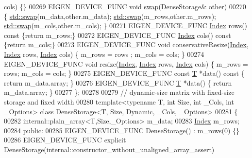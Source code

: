 \begin{DoxyCode}
      cols) \{\}
00269     EIGEN\_DEVICE\_FUNC \textcolor{keywordtype}{void} \hyperlink{endian_8c_a3ca5ecd34b04d6a243c054ac3a57f68d}{swap}(DenseStorage& other)
00270     \{ \hyperlink{endian_8c_a3ca5ecd34b04d6a243c054ac3a57f68d}{std::swap}(m\_data,other.m\_data); \hyperlink{endian_8c_a3ca5ecd34b04d6a243c054ac3a57f68d}{std::swap}(m\_rows,other.m\_rows); 
      \hyperlink{endian_8c_a3ca5ecd34b04d6a243c054ac3a57f68d}{std::swap}(m\_cols,other.m\_cols); \}
00271     EIGEN\_DEVICE\_FUNC \hyperlink{namespace_eigen_a62e77e0933482dafde8fe197d9a2cfde}{Index} rows()\textcolor{keyword}{ const }\{\textcolor{keywordflow}{return} m\_rows;\}
00272     EIGEN\_DEVICE\_FUNC \hyperlink{namespace_eigen_a62e77e0933482dafde8fe197d9a2cfde}{Index} cols()\textcolor{keyword}{ const }\{\textcolor{keywordflow}{return} m\_cols;\}
00273     EIGEN\_DEVICE\_FUNC \textcolor{keywordtype}{void} conservativeResize(\hyperlink{namespace_eigen_a62e77e0933482dafde8fe197d9a2cfde}{Index}, \hyperlink{namespace_eigen_a62e77e0933482dafde8fe197d9a2cfde}{Index} rows, \hyperlink{namespace_eigen_a62e77e0933482dafde8fe197d9a2cfde}{Index} cols) \{ m\_rows = rows
      ; m\_cols = cols; \}
00274     EIGEN\_DEVICE\_FUNC \textcolor{keywordtype}{void} resize(\hyperlink{namespace_eigen_a62e77e0933482dafde8fe197d9a2cfde}{Index}, \hyperlink{namespace_eigen_a62e77e0933482dafde8fe197d9a2cfde}{Index} rows, \hyperlink{namespace_eigen_a62e77e0933482dafde8fe197d9a2cfde}{Index} cols) \{ m\_rows = rows; m\_cols = 
      cols; \}
00275     EIGEN\_DEVICE\_FUNC \textcolor{keyword}{const} \hyperlink{group___sparse_core___module_class_eigen_1_1_triplet}{T} *data()\textcolor{keyword}{ const }\{ \textcolor{keywordflow}{return} m\_data.array; \}
00276     EIGEN\_DEVICE\_FUNC \hyperlink{group___sparse_core___module_class_eigen_1_1_triplet}{T} *data() \{ \textcolor{keywordflow}{return} m\_data.array; \}
00277 \};
00278 
00279 \textcolor{comment}{// dynamic-size matrix with fixed-size storage and fixed width}
00280 \textcolor{keyword}{template}<\textcolor{keyword}{typename} T, \textcolor{keywordtype}{int} Size, \textcolor{keywordtype}{int} \_Cols, \textcolor{keywordtype}{int} \_Options> \textcolor{keyword}{class }DenseStorage<T, Size, Dynamic, \_Cols,
       \_Options>
00281 \{
00282     internal::plain\_array<T,Size,\_Options> m\_data;
00283     \hyperlink{namespace_eigen_a62e77e0933482dafde8fe197d9a2cfde}{Index} m\_rows;
00284   \textcolor{keyword}{public}:
00285     EIGEN\_DEVICE\_FUNC DenseStorage() : m\_rows(0) \{\}
00286     EIGEN\_DEVICE\_FUNC \textcolor{keyword}{explicit} DenseStorage(internal::constructor\_without\_unaligned\_array\_assert)

\end{DoxyCode}
